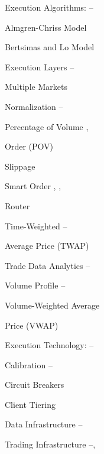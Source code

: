 \begin{multicols}{2}
\noindent Execution Algorithms: \hfill \pageref{in:exec_alg1}--\pageref{in:exec_alg2} \par
\twoindent Almgren-Chriss Model \hfill \pageref{in:alm_chriss} \par
\twoindent Bertsimas and Lo Model \hfill \pageref{in:bert_lo} \par
\twoindent Execution Layers \hfill \pageref{in:exec_layer1}--\pageref{in:exec_layer2} \par
\twoindent Multiple Markets \hfill  \pageref{in:mult_mark} \par 
\twoindent Normalization \hfill \pageref{in:normalization1}--\pageref{in:normalization2} \par
\twoindent Percentage of Volume \hfill \pageref{in:pov1}, \pageref{in:pov2} \par \hspace{0.75cm} Order (POV) \par 
\twoindent Slippage \hfill \pageref{in:slippage} \par
\twoindent Smart Order \hfill \pageref{in:sor1}, \pageref{in:sor2}, \pageref{in:sor3} \par \hspace{0.75cm} Router \par
\twoindent Time-Weighted \hfill \pageref{in:twap1}--\pageref{in:twap2} \par
\hspace{0.75cm} Average Price (TWAP) \par
\twoindent Trade Data Analytics \hfill \pageref{in:tda1}--\pageref{in:tda2} \par
\twoindent Volume Profile \hfill \pageref{in:vol_prof1}--\pageref{in:vol_prof2} \par
\twoindent Volume-Weighted Average \hfill \pageref{in:vwap} \par \hspace{0.75cm} Price (VWAP)
\vspace{\baselineskip}


\noindent Execution Technology: \hfill \pageref{in:exec_tech1}--\pageref{in:exec_tech2} \par
\twoindent Calibration \hfill \pageref{in:calb1}--\pageref{in:calb2} \par
\twoindent Circuit Breakers \hfill \pageref{in:circ_br} \par
\twoindent Client Tiering \hfill \pageref{in:client_t1} \par %
\twoindent Data Infrastructure \hfill \pageref{in:dat_infr1}--\pageref{in:dat_infr2} \par
\twoindent Trading Infrastructure \hfill \pageref{in:trad_infr1}--\pageref{in:trad_infr2}, \par \hfill \pageref{in:trad_infr3}%
\vspace{\baselineskip}



\end{multicols}
